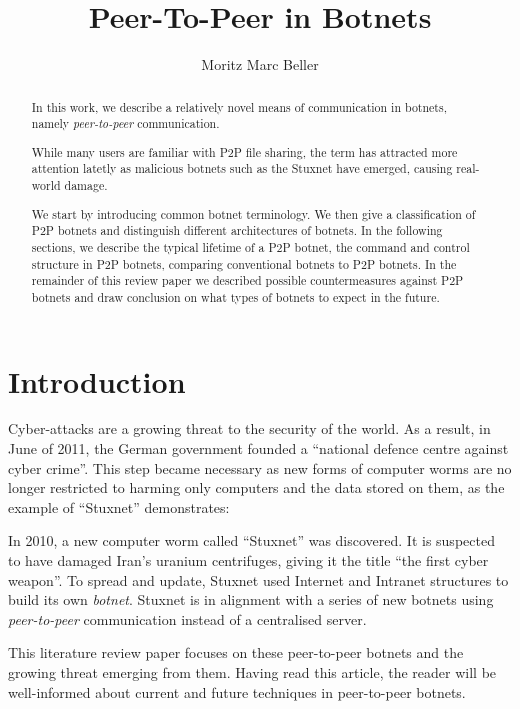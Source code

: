 \documentclass{llncs}
\title{Peer-To-Peer in Botnets}
\author{Moritz Marc Beller}
\institute{%
   Fakultät für Informatik, \\
   Technische Universität München \\
   \email{\{beller\}@in.tum.de}
}
\begin{document}
\maketitle

\begin{abstract}
In this work, we describe a relatively novel means of communication in
botnets, namely {\it peer-to-peer} communication.  

While many users are familiar with P2P file sharing, the term has
attracted more attention latetly as malicious botnets such as the
Stuxnet have emerged, causing real-world damage.

We start by introducing common botnet terminology. We then give a
classification of P2P botnets and distinguish different architectures
of botnets. In the following sections, we describe the typical
lifetime of a P2P botnet, the command and control structure in P2P
botnets, comparing conventional botnets to P2P botnets. In the
remainder of this review paper we described possible countermeasures
against P2P botnets and draw conclusion on what types of botnets to
expect in the future.
\end{abstract}

\section{Introduction}

Cyber-attacks are a growing threat to the security of the world. As a
result, in June of 2011, the German government founded a ``national
defence centre against cyber crime''.\cite{cyber} This step became
necessary as new forms of computer worms are no longer restricted to
harming only computers and the data stored on them, as the example of
``Stuxnet'' demonstrates:

 In 2010, a new computer worm called ``Stuxnet'' was discovered. It is
 suspected to have damaged Iran's uranium centrifuges, giving it the
 title ``the first cyber weapon''\cite{benzin2011first}. To spread and
 update, Stuxnet used Internet and Intranet structures to build its
 own {\it botnet}.\cite{fallierew32} Stuxnet is in alignment with a series
 of new botnets using {\it peer-to-peer} communication instead of a
 centralised server. 

This literature review paper focuses on these peer-to-peer botnets and
the growing threat emerging from them. Having read this article, the
reader will be well-informed about current and future techniques in
peer-to-peer botnets.
\end{document}
